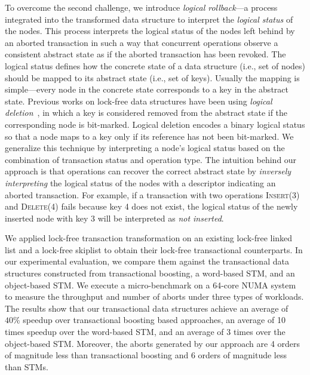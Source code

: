 \documentclass[]{sig-alternate-05-2015}
\begin{document}
To overcome the second challenge, we introduce \emph{logical rollback}---a process integrated into the transformed data structure to interpret the \emph{logical status} of the nodes.
This process interprets the logical status of the nodes left behind by an aborted transaction in such a way that concurrent operations observe a consistent abstract state as if the aborted transaction has been revoked.
The logical status defines how the concrete state of a data structure (i.e., set of nodes) should be mapped to its abstract state (i.e., set of keys).
Usually the mapping is simple---every node in the concrete state corresponds to a key in the abstract state.
Previous works on lock-free data structures have been using \emph{logical deletion}~\cite{harris2001pragmatic}, in which a key is considered removed from the abstract state if the corresponding node is bit-marked.
Logical deletion encodes a binary logical status so that a node maps to a key only if its reference has not been bit-marked.
We generalize this technique by interpreting a node's logical status based on the combination of transaction status and operation type.
The intuition behind our approach is that operations can recover the correct abstract state by \emph{inversely interpreting} the logical status of the nodes with a descriptor indicating an aborted transaction.
For example, if a transaction with two operations \textsc{Insert(3)} and \textsc{Delete(4)} fails because key 4 does not exist, the logical status of the newly inserted node with key 3 will be interpreted as \emph{not inserted}.

We applied lock-free transaction transformation on an existing lock-free linked list and a lock-free skiplist to obtain their lock-free transactional counterparts.
In our experimental evaluation, we compare them against the transactional data structures constructed from transactional boosting, a word-based STM, and an object-based STM.
We execute a micro-benchmark on a 64-core NUMA system to measure the throughput and number of aborts under three types of workloads.
The results show that our transactional data structures achieve an average of $40\%$ speedup over transactional boosting based approaches, an average of 10 times speedup over the word-based STM, and an average of 3 times over the object-based STM.
Moreover, the aborts generated by our approach are 4 orders of magnitude less than transactional boosting and 6 orders of magnitude less than STMs.
\end{document}
